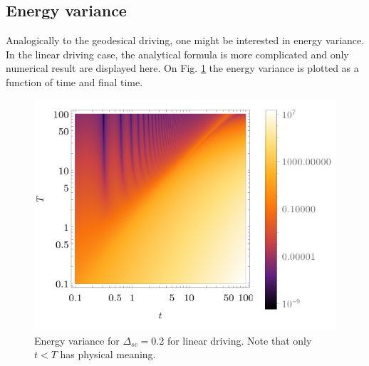 \subsection{Energy variance}
Analogically to the geodesical driving, one might be interested in energy variance. In the linear driving case, the analytical formula is more complicated and only numerical result are displayed here. On Fig. \ref{fig:densVariance} the energy variance is plotted as a function of time and final time.
\begin{figure}[H]
    \centering
    \includegraphics[scale=1.2]{../img/densVariance.pdf}
    \caption{Energy variance for $\Delta_{sc}=0.2$ for linear driving. Note that only $t<T$ has physical meaning.}
    \label{fig:densVariance}
\end{figure}